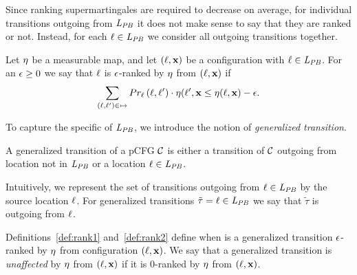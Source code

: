 Since ranking supermartingales are required to decrease on average, for 
individual transitions outgoing from $\mathit{L}_{\mathit{PB}}$ it does not make sense to say 
that they are ranked or not. Instead, for each $\ell\in\mathit{L}_{\mathit{PB}}$ we consider all 
outgoing transitions together.

\begin{definition}
\label{def:rank2}
Let $\eta$ be a measurable map, and let $(\ell,\mathbf{x})$ be a configuration with
$\ell\in \mathit{L}_{\mathit{PB}}$. For an $\epsilon\geq 0$ we say that $\ell$ is $\epsilon$-ranked by 
$\eta$ from $(\ell,\mathbf{x})$ if 
$$\sum_{(\ell,\ell')\in\mapsto} 
		Pr_{\ell}\left(\ell,\ell'\right)\cdot
		\eta(\ell',\mathbf{x}\leq \eta(\ell,\mathbf{x})-\epsilon.$$
\end{definition}

To capture the specific of $\mathit{L}_{\mathit{PB}}$, we introduce the 
notion of \emph{generalized transition}.

\begin{definition}
A generalized transition of a pCFG $\mathcal{C}$ is either a transition of $\mathcal{C}$ 
outgoing 
from location not in $\mathit{L}_{\mathit{PB}}$ or a location $\ell\in\mathit{L}_{\mathit{PB}}$.
\end{definition}

Intuitively, we represent the set of transitions outgoing from $\ell\in\mathit{L}_{\mathit{PB}}$ 
by the source location $\ell$.  For generalized transitions 
$\tilde{\tau}=\ell\in\mathit{L}_{\mathit{PB}}$ we say that $\tilde{\tau}$ is outgoing from 
$\ell$.

Definitions~\ref{def:rank1} and~\ref{def:rank2} 
define when is a generalized transition $\epsilon$-ranked by $\eta$ from 
configuration $(\ell,\mathbf{x})$. We say that a 
generalized transition is \emph{unaffected} by $\eta$ from $(\ell,\mathbf{x})$ if 
it is $0$-ranked by $\eta$ from $(\ell,\mathbf{x})$.

